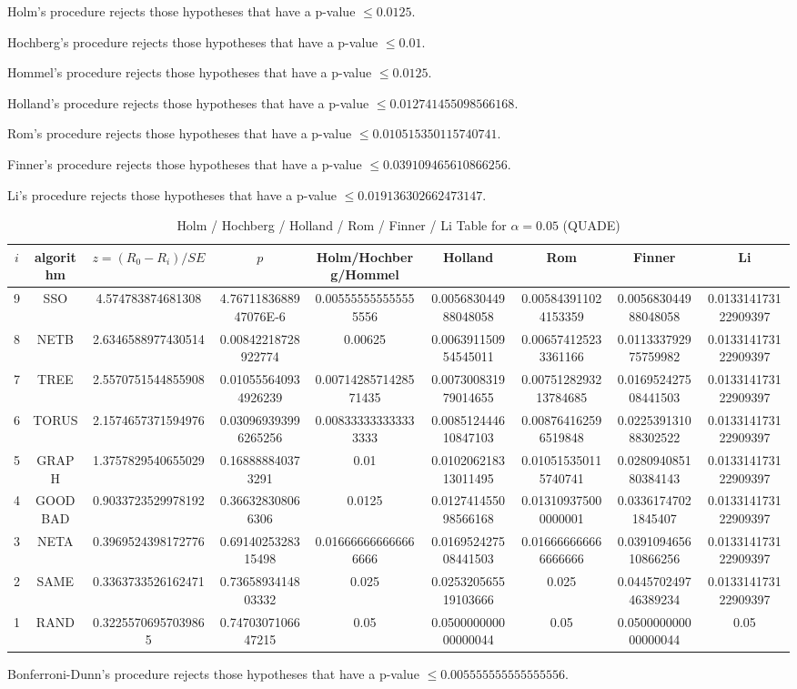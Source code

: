 \documentclass[a4paper,10pt]{article}
\begin{document}
\begin{landscape}
Holm's procedure rejects those hypotheses that have a p-value $\le0.0125$.


Hochberg's procedure rejects those hypotheses that have a p-value $\le0.01$.


Hommel's procedure rejects those hypotheses that have a p-value $\le0.0125$.


Holland's procedure rejects those hypotheses that have a p-value $\le0.012741455098566168$.


Rom's procedure rejects those hypotheses that have a p-value $\le0.010515350115740741$.


Finner's procedure rejects those hypotheses that have a p-value $\le0.039109465610866256$.


Li's procedure rejects those hypotheses that have a p-value $\le0.019136302662473147$.



\newpage

\begin{table}[!htp]
\centering\scriptsize
\caption{Holm / Hochberg / Holland / Rom / Finner / Li Table for $\alpha=0.05$ (QUADE)}
\begin{tabular}{ccccccccc}
$i$&algorithm&$z=(R_0 - R_i)/SE$&$p$&Holm/Hochberg/Hommel&Holland&Rom&Finner&Li\\
\hline
9& SSO&4.574783874681308&4.7671183688947076E-6&0.005555555555555556&0.005683044988048058&0.005843911024153359&0.005683044988048058&0.013314173122909397\\
8& NETB&2.6346588977430514&0.00842218728922774&0.00625&0.006391150954545011&0.006574125233361166&0.011333792975759982&0.013314173122909397\\
7& TREE&2.5570751544855908&0.010555640934926239&0.0071428571428571435&0.007300831979014655&0.0075128293213784685&0.016952427508441503&0.013314173122909397\\
6& TORUS&2.1574657371594976&0.030969393996265256&0.008333333333333333&0.008512444610847103&0.008764162596519848&0.022539131088302522&0.013314173122909397\\
5& GRAPH&1.3757829540655029&0.168888840373291&0.01&0.010206218313011495&0.010515350115740741&0.028094085180384143&0.013314173122909397\\
4& GOODBAD&0.9033723529978192&0.366328308066306&0.0125&0.012741455098566168&0.013109375000000001&0.03361747021845407&0.013314173122909397\\
3& NETA&0.3969524398172776&0.6914025328315498&0.016666666666666666&0.016952427508441503&0.016666666666666666&0.039109465610866256&0.013314173122909397\\
2& SAME&0.3363733526162471&0.7365893414803332&0.025&0.025320565519103666&0.025&0.044570249746389234&0.013314173122909397\\
1& RAND&0.32255706957039865&0.7470307106647215&0.05&0.050000000000000044&0.05&0.050000000000000044&0.05\\
\hline
\end{tabular}
\end{table}
Bonferroni-Dunn's procedure rejects those hypotheses that have a p-value $\le0.005555555555555556$.



\end{landscape}
\end{document}
